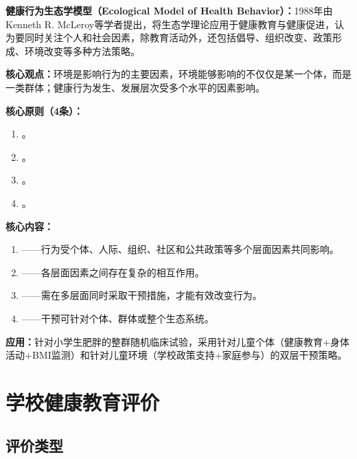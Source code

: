 \begin{keybox}
\textbf{健康行为生态学模型（Ecological Model of Health Behavior）：}1988年由Kenneth R. McLeroy等学者提出，将生态学理论应用于健康教育与健康促进，认为要同时关注个人和社会因素，除教育活动外，还包括倡导、组织改变、政策形成、环境改变等多种方法策略。

\textbf{核心观点：}环境是影响行为的主要因素，环境能够影响的不仅仅是某一个体，而是一类群体；健康行为发生、发展层次受多个水平的因素影响。

\textbf{核心原则（4条）：}
\begin{enumerate}[leftmargin=*]
    \item {}。
    \item {}。
    \item {}。
    \item {}。
\end{enumerate}

\textbf{核心内容：}
\begin{enumerate}[leftmargin=*]
    \item {}——行为受个体、人际、组织、社区和公共政策等多个层面因素共同影响。
    \item {}——各层面因素之间存在复杂的相互作用。
    \item {}——需在多层面同时采取干预措施，才能有效改变行为。
    \item {}——干预可针对个体、群体或整个生态系统。
\end{enumerate}

\textbf{应用：}针对小学生肥胖的整群随机临床试验，采用针对儿童个体（健康教育+身体活动+BMI监测）和针对儿童环境（学校政策支持+家庭参与）的双层干预策略。
\end{keybox}

\newpage

\section{学校健康教育评价}

\subsection{评价类型}

